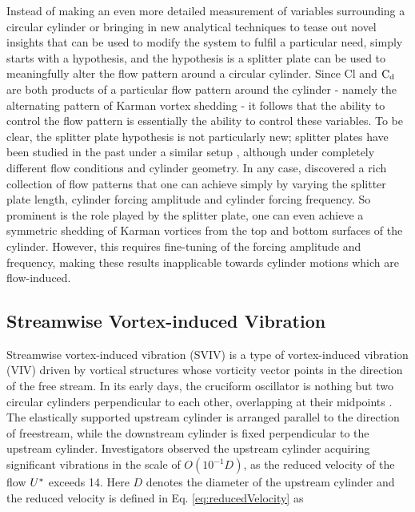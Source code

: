 \documentclass[oneside]{utmthesis}
\begin{document}
Instead of making an even more detailed measurement of variables surrounding a circular cylinder or bringing in new analytical techniques to tease out novel insights that can be used to modify the system to fulfil a particular need, \citet{Yokoi2016} simply starts with a hypothesis, and the hypothesis is a splitter plate can be used to meaningfully alter the flow pattern around a circular cylinder. Since Cl and $\text{C}_{\text{d}}$ are both products of a particular flow pattern around the cylinder - namely the alternating pattern of Karman vortex shedding - it follows that the ability to control the flow pattern is essentially the ability to control these variables. To be clear, the splitter plate hypothesis is not particularly new; splitter plates have been studied in the past under a similar setup \citep{MatAli2011,MatAli2012}, although under completely different flow conditions and cylinder geometry. In any case, \citet{Yokoi2016} discovered a rich collection of flow patterns that one can achieve simply by varying the splitter plate length, cylinder forcing amplitude and cylinder forcing frequency. So prominent is the role played by the splitter plate, one can even achieve a symmetric shedding of Karman vortices from the top and bottom surfaces of the cylinder. However, this requires fine-tuning of the forcing amplitude and frequency, making these results inapplicable towards cylinder motions which are flow-induced.



\subsection{Streamwise Vortex-induced Vibration}
Streamwise vortex-induced vibration (SVIV) is a type of vortex-induced vibration (VIV) driven by vortical structures whose vorticity vector points in the direction of the free stream. In its early days, the cruciform oscillator is nothing but two circular cylinders perpendicular to each other, overlapping at their midpoints \citep{Zdravkovich1981,Zdravkovich1983,Zdravkovich1985}.
The elastically supported upstream cylinder is arranged parallel to the direction of freestream, while the downstream cylinder is fixed perpendicular to the upstream cylinder. Investigators observed the upstream cylinder acquiring significant vibrations in the scale of $O(10^{-1}D)$, as the reduced velocity of the flow $U^{*}$ exceeds 14. Here $D$ denotes the diameter of the upstream cylinder and the reduced velocity is defined in Eq. \ref{eq:reducedVelocity} as
\end{document}
